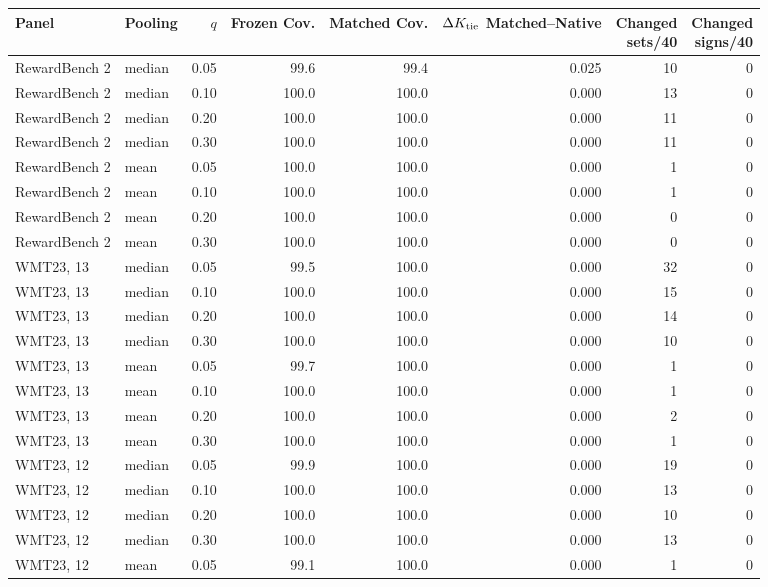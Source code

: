 \begin{table}[t]
\centering\small
\begin{tabular}{llrrrrrr}
\toprule
Panel & Pooling & $q$ & Frozen Cov. & Matched Cov. & \shortstack{$\Delta K_{\rm tie}$\\Matched--Native} & \shortstack{Changed\\sets/40} & \shortstack{Changed\\signs/40} \\
\midrule
RewardBench 2 & median & 0.05 & 99.6 & 99.4 & 0.025 & 10 & 0 \\
RewardBench 2 & median & 0.10 & 100.0 & 100.0 & 0.000 & 13 & 0 \\
RewardBench 2 & median & 0.20 & 100.0 & 100.0 & 0.000 & 11 & 0 \\
RewardBench 2 & median & 0.30 & 100.0 & 100.0 & 0.000 & 11 & 0 \\
RewardBench 2 & mean & 0.05 & 100.0 & 100.0 & 0.000 & 1 & 0 \\
RewardBench 2 & mean & 0.10 & 100.0 & 100.0 & 0.000 & 1 & 0 \\
RewardBench 2 & mean & 0.20 & 100.0 & 100.0 & 0.000 & 0 & 0 \\
RewardBench 2 & mean & 0.30 & 100.0 & 100.0 & 0.000 & 0 & 0 \\
WMT23, 13 & median & 0.05 & 99.5 & 100.0 & 0.000 & 32 & 0 \\
WMT23, 13 & median & 0.10 & 100.0 & 100.0 & 0.000 & 15 & 0 \\
WMT23, 13 & median & 0.20 & 100.0 & 100.0 & 0.000 & 14 & 0 \\
WMT23, 13 & median & 0.30 & 100.0 & 100.0 & 0.000 & 10 & 0 \\
WMT23, 13 & mean & 0.05 & 99.7 & 100.0 & 0.000 & 1 & 0 \\
WMT23, 13 & mean & 0.10 & 100.0 & 100.0 & 0.000 & 1 & 0 \\
WMT23, 13 & mean & 0.20 & 100.0 & 100.0 & 0.000 & 2 & 0 \\
WMT23, 13 & mean & 0.30 & 100.0 & 100.0 & 0.000 & 1 & 0 \\
WMT23, 12 & median & 0.05 & 99.9 & 100.0 & 0.000 & 19 & 0 \\
WMT23, 12 & median & 0.10 & 100.0 & 100.0 & 0.000 & 13 & 0 \\
WMT23, 12 & median & 0.20 & 100.0 & 100.0 & 0.000 & 10 & 0 \\
WMT23, 12 & median & 0.30 & 100.0 & 100.0 & 0.000 & 13 & 0 \\
WMT23, 12 & mean & 0.05 & 99.1 & 100.0 & 0.000 & 1 & 0 \\

\end{tabular}
\end{table}
